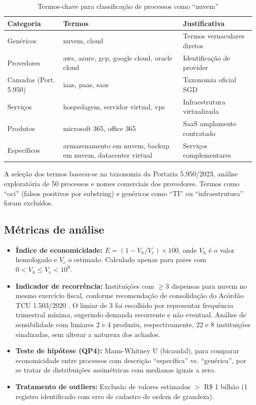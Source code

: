 \documentclass[12pt]{article}
\begin{document}
\begin{table}[ht]
\centering
\caption{Termos-chave para classificação de processos como ``nuvem''}
\label{tab:termos}
\small
\begin{tabular}{p{2.8cm}p{5.5cm}p{4cm}}
\toprule
\textbf{Categoria} & \textbf{Termos} & \textbf{Justificativa} \\
\midrule
Genéricos & nuvem, cloud & Termos vernaculares diretos \\
Provedores & aws, azure, gcp, google cloud, oracle cloud & Identificação de provider \\
Camadas (Port. 5.950) & iaas, paas, saas & Taxonomia oficial SGD \\
Serviços & hospedagem, servidor virtual, vps & Infraestrutura virtualizada \\
Produtos & microsoft 365, office 365 & SaaS amplamente contratado \\
Específicos & armazenamento em nuvem, backup em nuvem, datacenter virtual & Serviços complementares \\
\bottomrule
\end{tabular}
\end{table}

A seleção dos termos baseou-se na taxonomia da Portaria 5.950/2023, análise exploratória de 50 processos e nomes comerciais dos provedores. Termos como ``oci'' (falsos positivos por substring) e genéricos como ``TI'' ou ``infraestrutura'' foram excluídos.

\subsection{Métricas de análise}

\begin{itemize}
\item \textbf{Índice de economicidade:} $E = (1 - V_h / V_e) \times 100$, onde $V_h$ é o valor homologado e $V_e$ o estimado. Calculado apenas para pares com $0 < V_h \leq V_e < 10^9$.
\item \textbf{Indicador de recorrência:} Instituições com $\geq$3 dispensas para nuvem no mesmo exercício fiscal, conforme recomendação de consolidação do Acórdão TCU 1.503/2020 \cite{tcu2020acordao1503}. O limiar de 3 foi escolhido por representar frequência trimestral mínima, sugerindo demanda recorrente e não eventual. Análise de sensibilidade com limiares 2 e 4 produziu, respectivamente, 22 e 8 instituições sinalizadas, sem alterar a natureza dos achados.
\item \textbf{Teste de hipótese (QP4):} Mann-Whitney U (bicaudal), para comparar economicidade entre processos com descrição ``específica'' vs. ``genérica'', por se tratar de distribuições assimétricas com medianas iguais a zero.
\item \textbf{Tratamento de outliers:} Exclusão de valores estimados $>$ R\$ 1 bilhão (1 registro identificado com erro de cadastro de ordem de grandeza).
\end{itemize}
\end{document}
